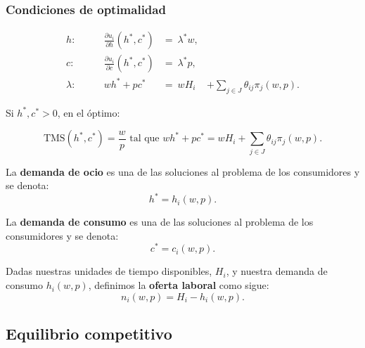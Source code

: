 \documentclass[8pt,a4paper]{extarticle}
\begin{document}
\begin{multicols}{3}
\sectionbreak

\subsubsection*{Condiciones de optimalidad}

\begin{equation*}
\begin{aligned}
	h : \qquad       & \frac{\partial u_i}{\partial h} (h^*, c^*) &=\ \lambda^* w,\\
	c : \qquad       & \frac{\partial u_i}{\partial c} (h^*, c^*) &=\ \lambda^* p,\\
	\lambda : \qquad & wh^* + pc^* &=\ wH_i                       & + \sum_{j \in J} \theta_{ij} \pi_j (w, p).
\end{aligned}
\end{equation*}

Si $h^*, c^* > 0$, en el óptimo:

\[ \text{TMS} (h^*, c^*) = \frac{w}{p} \text{ tal que } wh^* + pc^* = wH_i + \sum_{j \in J} \theta_{ij} \pi_j(w, p) .\]

\begin{boxdef}
	La \textbf{demanda de ocio} es una de las soluciones al problema de los consumidores y se denota:
	\[
		h^* = h_i(w, p)
	.\] 
\end{boxdef}

\begin{boxdef}
	La \textbf{demanda de consumo} es una de las soluciones al problema de los consumidores y se denota:
	\[
		c^* = c_i(w, p)
	.\] 
\end{boxdef}

\begin{boxdef}
	Dadas nuestras unidades de tiempo disponibles, $H_i$, y nuestra demanda de consumo $h_i(w, p)$, definimos la \textbf{oferta laboral} como sigue:
	\[
		n_i(w, p) = H_i - h_i(w, p)
	.\] 
\end{boxdef}

\newpage

\subsection{Equilibrio competitivo}


\end{multicols}
\end{document}
